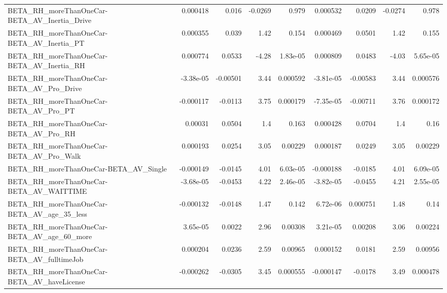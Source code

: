 \begin{tabular}{lrrrrrrrr}
BETA\_RH\_moreThanOneCar-BETA\_AV\_Inertia\_Drive       &    0.000418 &        0.016 &  -0.0269 &    0.979 &   0.000532 &      0.0209 &      -0.0274 &         0.978 \\
BETA\_RH\_moreThanOneCar-BETA\_AV\_Inertia\_PT          &    0.000355 &        0.039 &     1.42 &    0.154 &   0.000469 &      0.0501 &         1.42 &         0.155 \\
BETA\_RH\_moreThanOneCar-BETA\_AV\_Inertia\_RH          &    0.000774 &       0.0533 &    -4.28 & 1.83e-05 &   0.000809 &      0.0483 &        -4.03 &      5.65e-05 \\
BETA\_RH\_moreThanOneCar-BETA\_AV\_Pro\_Drive           &   -3.38e-05 &     -0.00501 &     3.44 & 0.000592 &  -3.81e-05 &    -0.00583 &         3.44 &      0.000576 \\
BETA\_RH\_moreThanOneCar-BETA\_AV\_Pro\_PT              &   -0.000117 &      -0.0113 &     3.75 & 0.000179 &  -7.35e-05 &    -0.00711 &         3.76 &      0.000172 \\
BETA\_RH\_moreThanOneCar-BETA\_AV\_Pro\_RH              &     0.00031 &       0.0504 &      1.4 &    0.163 &   0.000428 &      0.0704 &          1.4 &          0.16 \\
BETA\_RH\_moreThanOneCar-BETA\_AV\_Pro\_Walk            &    0.000193 &       0.0254 &     3.05 &  0.00229 &   0.000187 &      0.0249 &         3.05 &       0.00229 \\
BETA\_RH\_moreThanOneCar-BETA\_AV\_Single              &   -0.000149 &      -0.0145 &     4.01 & 6.03e-05 &  -0.000188 &     -0.0185 &         4.01 &      6.09e-05 \\
BETA\_RH\_moreThanOneCar-BETA\_AV\_WAITTIME            &   -3.68e-05 &      -0.0453 &     4.22 & 2.46e-05 &  -3.82e-05 &     -0.0455 &         4.21 &      2.55e-05 \\
BETA\_RH\_moreThanOneCar-BETA\_AV\_age\_35\_less         &   -0.000132 &      -0.0148 &     1.47 &    0.142 &   6.72e-06 &    0.000751 &         1.48 &          0.14 \\
BETA\_RH\_moreThanOneCar-BETA\_AV\_age\_60\_more         &    3.65e-05 &       0.0022 &     2.96 &  0.00308 &   3.21e-05 &     0.00208 &         3.06 &       0.00224 \\
BETA\_RH\_moreThanOneCar-BETA\_AV\_fulltimeJob         &    0.000204 &       0.0236 &     2.59 &  0.00965 &   0.000152 &      0.0181 &         2.59 &       0.00956 \\
BETA\_RH\_moreThanOneCar-BETA\_AV\_haveLicense         &   -0.000262 &      -0.0305 &     3.45 & 0.000555 &  -0.000147 &     -0.0178 &         3.49 &      0.000478 \\

\end{tabular}
